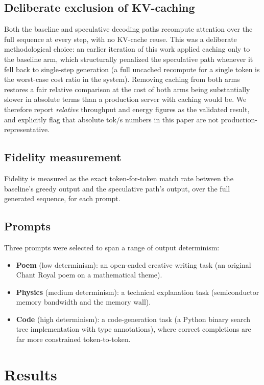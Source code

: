 \documentclass[conference]{IEEEtran}
\begin{document}
\subsection{Deliberate exclusion of KV-caching}

Both the baseline and speculative decoding paths recompute attention over
the full sequence at every step, with no KV-cache reuse. This was a
deliberate methodological choice: an earlier iteration of this work applied
caching only to the baseline arm, which structurally penalized the
speculative path whenever it fell back to single-step generation (a full
uncached recompute for a single token is the worst-case cost ratio in the
system). Removing caching from both arms restores a fair relative
comparison at the cost of both arms being substantially slower in absolute
terms than a production server with caching would be. We therefore report
\emph{relative} throughput and energy figures as the validated result, and
explicitly flag that absolute tok/s numbers in this paper are not
production-representative.

\subsection{Fidelity measurement}

Fidelity is measured as the exact token-for-token match rate between the
baseline's greedy output and the speculative path's output, over the full
generated sequence, for each prompt.

\subsection{Prompts}

Three prompts were selected to span a range of output determinism:
\begin{itemize}
\item \textbf{Poem} (low determinism): an open-ended creative writing task
(an original Chant Royal poem on a mathematical theme).
\item \textbf{Physics} (medium determinism): a technical explanation task
(semiconductor memory bandwidth and the memory wall).
\item \textbf{Code} (high determinism): a code-generation task (a Python
binary search tree implementation with type annotations), where correct
completions are far more constrained token-to-token.
\end{itemize}

\section{Results}
\label{sec:results}
\end{document}
